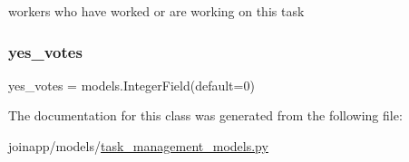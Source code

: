 workers who have worked or are working on this task 

\mbox{\label{classjoinapp_1_1models_1_1task__management__models_1_1_sec_pred_task_ab50f50bde4c2c1524460c48def8f27f3}} 
\subsubsection{\texorpdfstring{yes\_votes}{yes\_votes}}
{\footnotesize\ttfamily yes\+\_\+votes = models.\+Integer\+Field(default=0)\hspace{0.3cm}{\ttfamily [static]}}



The documentation for this class was generated from the following file\+:\begin{DoxyCompactItemize}
\item 
joinapp/models/\mbox{\hyperlink{task__management__models_8py}{task\+\_\+management\+\_\+models.\+py}}\end{DoxyCompactItemize}
